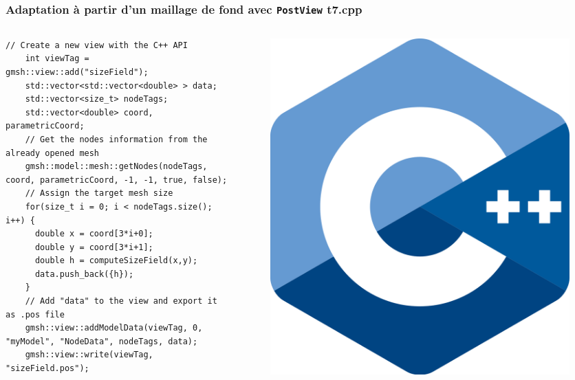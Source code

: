 \documentclass[aspectratio=169]{beamer}
\begin{document}
\begin{frame}[fragile]
\frametitle{Adaptation à partir d'un maillage de fond avec \texttt{PostView} \hfill t7.cpp}
\begin{columns}
  \begin{column}{1.1\linewidth}
  \begin{lstlisting}[frame=none, aboveskip=1mm]
    // Create a new view with the C++ API
    int viewTag = gmsh::view::add("sizeField");
    std::vector<std::vector<double> > data;
    std::vector<size_t> nodeTags;
    std::vector<double> coord, parametricCoord;
    // Get the nodes information from the already opened mesh
    gmsh::model::mesh::getNodes(nodeTags, coord, parametricCoord, -1, -1, true, false);
    // Assign the target mesh size
    for(size_t i = 0; i < nodeTags.size(); i++) {
      double x = coord[3*i+0];
      double y = coord[3*i+1];
      double h = computeSizeField(x,y);
      data.push_back({h});
    }
    // Add "data" to the view and export it as .pos file
    gmsh::view::addModelData(viewTag, 0, "myModel", "NodeData", nodeTags, data);
    gmsh::view::write(viewTag, "sizeField.pos");
  \end{lstlisting}
  \end{column}
  \begin{column}{0.9\linewidth}
    \begin{figure}
      \vspace{-5.5cm}
      \hspace{-13cm}
      \includegraphics[width=0.1\linewidth]{figures/cpp.png}
      \caption{}
      \label{}
    \end{figure}
  \end{column}
\end{columns}
\end{frame}
\end{document}
